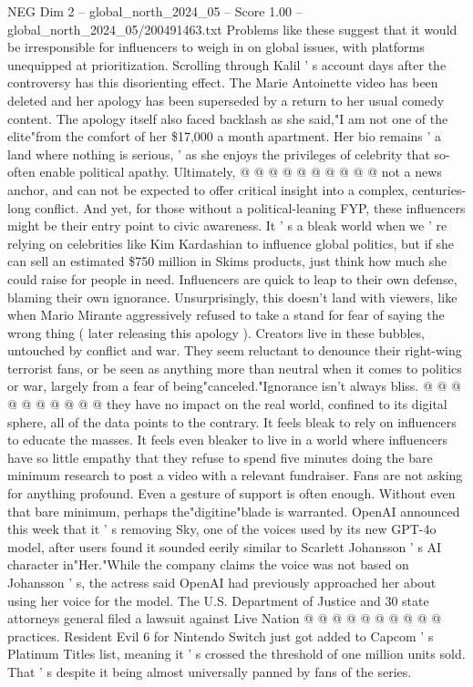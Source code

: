 \begin{textsample}{NEG Dim 2 – global\_north\_2024\_05 – Score 1.00 – global\_north\_2024\_05/200491463.txt}
Problems like these suggest that it would be irresponsible for influencers to weigh in on global issues, with platforms unequipped at prioritization.
Scrolling through Kalil ' s account days after the controversy has this disorienting effect.
The Marie Antoinette video has been deleted and her apology has been superseded by a return to her usual comedy content.
The apology itself also faced backlash as she said,"I am not one of the elite"from the comfort of her \$17,000 a month apartment.
Her bio remains ' a land where nothing is serious, ' as she enjoys the privileges of celebrity that so-often enable political apathy.
Ultimately, @ @ @ @ @ @ @ @ @ @ not a news anchor, and can not be expected to offer critical insight into a complex, centuries-long conflict.
And yet, for those without a political-leaning FYP, these influencers might be their entry point to civic awareness.
It ' s a bleak world when we ' re relying on celebrities like Kim Kardashian to influence global politics, but if she can sell an estimated \$750 million in Skims products, just think how much she could raise for people in need.
Influencers are quick to leap to their own defense, blaming their own ignorance.
Unsurprisingly, this doesn't land with viewers, like when Mario Mirante aggressively refused to take a stand for fear of saying the wrong thing ( later releasing this apology ).
Creators live in these bubbles, untouched by conflict and war.
They seem reluctant to denounce their right-wing terrorist fans, or be seen as anything more than neutral when it comes to politics or war, largely from a fear of being"canceled."Ignorance isn't always bliss. @ @ @ @ @ @ @ @ @ @ they have no impact on the real world, confined to its digital sphere, all of the data points to the contrary.
It feels bleak to rely on influencers to educate the masses.
It feels even bleaker to live in a world where influencers have so little empathy that they refuse to spend five minutes doing the bare minimum research to post a video with a relevant fundraiser.
Fans are not asking for anything profound.
Even a gesture of support is often enough.
Without even that bare minimum, perhaps the"digitine"blade is warranted.
OpenAI announced this week that it ' s removing Sky, one of the voices used by its new GPT-4o model, after users found it sounded eerily similar to Scarlett Johansson ' s AI character in"Her."While the company claims the voice was not based on Johansson ' s, the actress said OpenAI had previously approached her about using her voice for the model.
The U.S.
Department of Justice and 30 state attorneys general filed a lawsuit against Live Nation @ @ @ @ @ @ @ @ @ @ practices.
Resident Evil 6 for Nintendo Switch just got added to Capcom ' s Platinum Titles list, meaning it ' s crossed the threshold of one million units sold.
That ' s despite it being almost universally panned by fans of the series.

\end{textsample}
